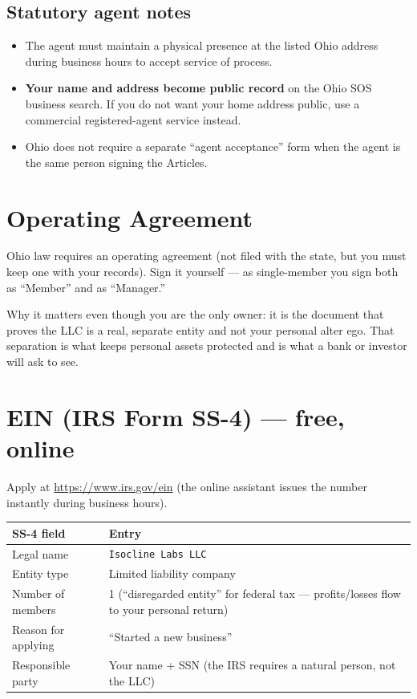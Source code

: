 \documentclass[11pt,a4paper]{article}
\newcommand{\code}[1]{\texttt{\small #1}}
\begin{document}
\subsection{Statutory agent notes}

\begin{itemize}[leftmargin=1.4em,itemsep=0.1em]
\item The agent must maintain a physical presence at the listed Ohio address
      during business hours to accept service of process.
\item \textbf{Your name and address become public record} on the Ohio SOS
      business search. If you do not want your home address public, use a
      commercial registered-agent service instead.
\item Ohio does not require a separate ``agent acceptance'' form when the agent
      is the same person signing the Articles.
\end{itemize}

\section{Operating Agreement}

Ohio law requires an operating agreement (not filed with the state, but you
must keep one with your records). Sign it yourself --- as single-member you sign
both as ``Member'' and as ``Manager.''

\noindent
Why it matters even though you are the only owner: it is the document that
proves the LLC is a real, separate entity and not your personal alter ego. That
separation is what keeps personal assets protected and is what a bank or
investor will ask to see.

\section{EIN (IRS Form SS-4) --- free, online}

Apply at \url{https://www.irs.gov/ein} (the online assistant issues the number
instantly during business hours).

\begin{center}
\begin{tabular}{@{}L{5.0cm}L{11.0cm}@{}}
\toprule
\textbf{SS-4 field} & \textbf{Entry} \\
\midrule
Legal name & \code{Isocline Labs LLC} \\
Entity type & Limited liability company \\
Number of members & 1 (``disregarded entity'' for federal tax --- profits/losses
flow to your personal return) \\
Reason for applying & ``Started a new business'' \\
Responsible party & Your name + SSN (the IRS requires a natural person, not the LLC) \\
\bottomrule
\end{tabular}
\end{center}
\end{document}
